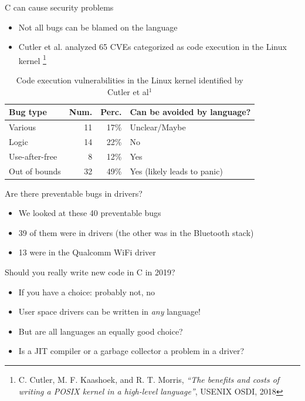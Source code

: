 \documentclass[NET,english,aspectratio=169,notitleframe,draft]{tumbeamer}
\begin{document}
\begin{frame}{C can cause security problems}
\begin{itemize}
\item Not all bugs can be blamed on the language
\item Cutler et al. analyzed 65 CVEs categorized as code execution in the Linux kernel \footnote{C. Cutler, M. F. Kaashoek, and R. T. Morris, \emph{``The benefits and costs of writing a POSIX kernel in a high-level language''}, USENIX OSDI, 2018}
\end{itemize}
\pause
\begin{table}
\centering
\begin{tabular}{ l  r r l }
  \toprule
  Bug type & Num. & Perc. & Can be avoided by language? \\
  \midrule
  Various & 11 & 17\% & Unclear/Maybe \\
  Logic & 14 & 22\% & No \\
  Use-after-free & 8 & 12\% & Yes \\
  Out of bounds & 32 & 49\% & Yes (likely leads to panic) \\
  \bottomrule  
\end{tabular}
\caption{Code execution vulnerabilities in the Linux kernel identified by Cutler et al$^1$}
\end{table}
\end{frame}

\begin{frame}{Are there preventable bugs in drivers?}
\begin{itemize}
\item We looked at these 40 preventable bugs
\pause
\item 39 of them were in drivers (the other was in the Bluetooth stack)
\pause
\item 13 were in the Qualcomm WiFi driver
\end{itemize}
\end{frame}

\begin{frame}{Should you really write new code in C in 2019?}
\begin{itemize}
\item If you have a choice: probably not, no
\pause
\item User space drivers can be written in \emph{any} language!
\item But are all languages an equally good choice?
\item Is a JIT compiler or a garbage collector a problem in a driver?
\end{itemize}
\end{frame}
\end{document}
